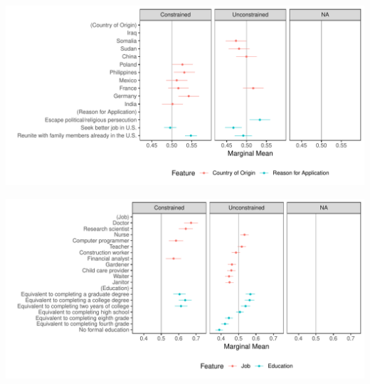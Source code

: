 \documentclass[a4paper,12pt]{article}\usepackage[]{graphicx}\usepackage[]{color}
\makeatletter
\def\maxwidth{ %
  \ifdim\Gin@nat@width>\linewidth
    \linewidth
  \else
    \Gin@nat@width
  \fi
}
\newenvironment{knitrout}{}{} %
\makeatother
\begin{document}
\begin{knitrout}
\color{fgcolor}
\includegraphics[width=\maxwidth]{figure/hainmueller_immigration_amce_appendix_split-1} 

\includegraphics[width=\maxwidth]{figure/hainmueller_immigration_amce_appendix_split-2} 

\end{knitrout}

\clearpage
\end{document}
